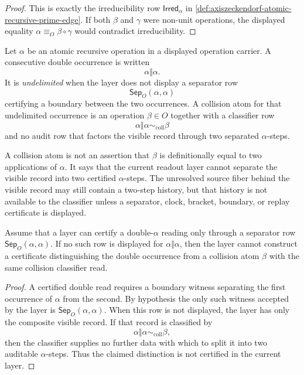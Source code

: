 \begin{proof}
This is exactly the irreducibility row
$\mathsf{Irred}_{\alpha}$ in
\autoref{def:axiszeckendorf-atomic-recursive-prime-edge}.  If both
$\beta$ and $\gamma$ were non-unit operations, the displayed equality
$\alpha\equiv_O\beta\circ\gamma$ would contradict irreducibility.
\end{proof}

\begin{definition}
\label{def:axiszeckendorf-undelimited-atomic-collision}
Let $\alpha$ be an atomic recursive operation in a displayed operation
carrier.  A consecutive double occurrence is written
$$
\alpha\Vert\alpha.
$$
It is \emph{undelimited} when the layer does not display a separator row
$$
\mathsf{Sep}_{O}(\alpha,\alpha)
$$
certifying a boundary between the two occurrences.  A collision atom for
that undelimited occurrence is an operation $\beta\in O$ together with a
classifier row
$$
\alpha\Vert\alpha\sim_{\mathrm{coll}}\beta
$$
and no audit row that factors the visible record through two separated
$\alpha$-steps.
\end{definition}

\begin{principle}
\label{prin:axiszeckendorf-collision-atoms-classifier-relative}
A collision atom is not an assertion that $\beta$ is definitionally equal
to two applications of $\alpha$.  It says that the current readout layer
cannot separate the visible record into two certified $\alpha$-steps.  The
unresolved source fiber behind the visible record may still contain a
two-step history, but that history is not available to the classifier
unless a separator, clock, bracket, boundary, or replay certificate is
displayed.
\end{principle}

\begin{theorem}
\label{thm:axiszeckendorf-no-separator-no-certified-double-read}
Assume that a layer can certify a double-$\alpha$ reading only through a
separator row $\mathsf{Sep}_{O}(\alpha,\alpha)$.  If no such row is
displayed for $\alpha\Vert\alpha$, then the layer cannot construct a
certificate distinguishing the double occurrence from a collision atom
$\beta$ with the same collision classifier read.
\end{theorem}

\begin{proof}
A certified double read requires a boundary witness separating the first
occurrence of $\alpha$ from the second.  By hypothesis the only such witness
accepted by the layer is $\mathsf{Sep}_{O}(\alpha,\alpha)$.  When this row is
not displayed, the layer has only the composite visible record.  If that
record is classified by
$$
\alpha\Vert\alpha\sim_{\mathrm{coll}}\beta,
$$
then the classifier supplies no further data with which to split it into two
auditable $\alpha$-steps.  Thus the claimed distinction is not certified in
the current layer.
\end{proof}

